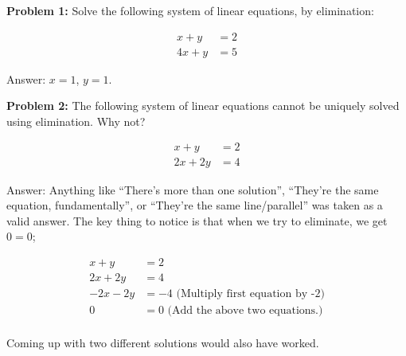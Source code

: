 \documentclass[a4paper,12pt]{article}
\begin{document}
{\Large{\bf Problem 1:}} Solve the following system of linear equations, by elimination:

\begin{align*}
x+y&=2\\
4x+y&=5
\end{align*}

Answer: $x=1$, $y=1$.

\shunt

\shunt

{\Large{\bf Problem 2:}} The following system of linear equations cannot be uniquely solved using elimination. Why not?

\begin{align*}
x+y&= 2\\
2x+2y &= 4
\end{align*}

Answer: Anything like ``There's more than one solution'', ``They're the same equation, fundamentally'', or ``They're the same line/parallel'' was taken as a valid answer. The key thing to notice is that when we try to eliminate, we get $0=0$;

\begin{align*}
x+y&=2\\
2x+2y&=4\\
-2x-2y&=-4 \text{ (Multiply first equation by -2)}\\
0&=0 \text{ (Add the above two equations.)}\\
\end{align*}

Coming up with two different solutions would also have worked.

\shunt

\shunt
\end{document}

